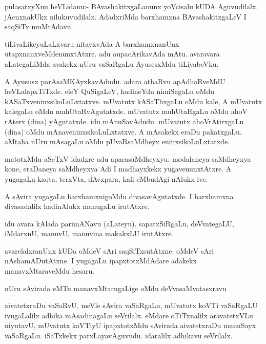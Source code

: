 \documentclass{article}
\begin{document}
\begin{mn}
pulasatxyXnu heVLidanu:- BAvashakitxgaLanunx yoVcisalu kUDA
Aguvudilalx. jAcnxnakUkx nilukuvudilalx. AdadxriMda barxhamxna
BAvashakitxgaLeV I saqSiTx muMtAdavu.
\end{mn}

\begin{mn}
tiLivaLikeyuLaLxvaru nitayxvAda A barxhamxnanUnx
utapxnanxveMdenunxtAtxre. adu aupacArikavAda mAtu. avaravara
aLategaLiMda avakekx nUru vaSaRgaLu AyusesxMdu tiLiyabeVku.
\end{mn}

\begin{mn}%
A Ayususx parAsaMKAyxkavAdudu. adara athaRvu apAdhaRveMdU
heVLalapxTiTxde. eleY QuSigaLeV, hadineYdu nimiSagaLu oMdu
kASaTxveninxsikoLuLxtatxve. mUvatutx kASaThxgaLu oMdu kale, A mUvatutx
kalegaLu oMdu muhUtaRvAgutatxde. mUvatutx muhUtaRgaLu oMdu ahoV rAterx
(dina) yAgutatxde. idu mAnuSavAdudu. mUvatutx ahoVrAtirxgaLu (dina)
oMdu mAnaveninxsikoLuLxtatxve. A mAsakekx eraDu pakatxgaLu. aMtaha
nUru mAsagaLu oMdu pUvaRsaMdheyx eninxsikoLuLxtatxde.
\end{mn}

\begin{mn}
matotxMdu aSeTxV idadxre adu aparasaMdheyxyu. modalaneya saMdheyxya
kone, eraDaneya saMdheyxya Adi I madhayxkekx yugavenunxtAtxre. A
yugagaLu kaqta, terxVta, dAvxpara, kali eMbudAgi nAlukx ive.
\end{mn}

\begin{mn}
A sAvira yugagaLu barxhamxnigoMdu divasavAgutatxde. I barxhamxna
divasadalilx hadinAlukx manugaLu irutAtxre.
\end{mn}

\begin{mn}%
idu avara kAlada parimANavu (aLateyu). sapatxSiRgaLu, deVvategaLU,
iMdarxnU, manuvU, manuvina makakxLU irutAtxre.
\end{mn}

\begin{mn}
avarelalxranUnx kUDa oMdeV sAri saqSiTxsutAtxne. oMdeV sAri
nAshamADutAtxne. I yugagaLu ipapxtotxMdAdare adakekx manavxMtaraveMdu hesaru.
\end{mn}

\begin{mn}
nUru sAvirada eMTu manavxMtarugaLige oMdu deVvasaMvatasxravu 
\end{mn}

\begin{mn}%
aivatetxraDu vaSaRvU, meVle sAvira vaSaRgaLu, mUvatutx koVTi vaSaRgaLU
ivugaLalilx adhika mAsadinagaLu seVrilalx. eMdare oTiTxnalilx
aravatetxVLu niyutavU, mUvatutx koVTiyU ipapxtotxMdu sAvirada
aivatetxraDu manuSayx vaSaRgaLu. iSaTxkekx parxLayavAguvudu. idaralilx
adhikavu seVrilalx.
\end{mn}
\end{document}
